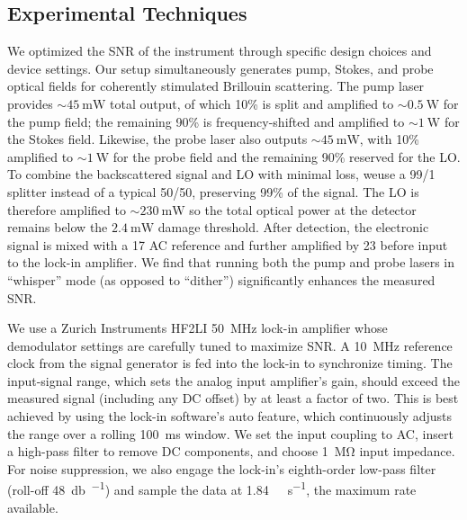 \subsection{Experimental Techniques}
\label{Methods:Experimental Techniques}
We optimized the \ac{SNR} of the instrument through specific design choices and device settings. Our setup simultaneously generates pump, Stokes, and probe optical fields for coherently stimulated Brillouin scattering. The pump laser provides \(\sim\!\SI{45}{\milli\watt}\) total output, of which 10\% is split and amplified to \(\sim\!\SI{0.5}{\watt}\) for the pump field; the remaining 90\% is frequency-shifted and amplified to \(\sim\!\SI{1}{\watt}\) for the Stokes field. Likewise, the probe laser also outputs \(\sim\!\SI{45}{\milli\watt}\), with 10\% amplified to \(\sim\!\SI{1}{\watt}\) for the probe field and the remaining 90\% reserved for the \ac{LO}. To combine the backscattered signal and \ac{LO} with minimal loss, weuse a 99/1 splitter instead of a typical 50/50, preserving 99\% of the signal. The \ac{LO} is therefore amplified to \(\sim\!\SI{230}{\milli\watt}\) so the total optical power at the detector remains below the \(\SI{2.4}{\milli\watt}\) damage threshold. After detection, the electronic signal is mixed with a \SI{17}{\dBm} \ac{AC} reference and further amplified by \SI{23}{\dBm} before input to the lock-in amplifier. We find that running both the pump and probe lasers in “whisper” mode (as opposed to “dither”) significantly enhances the measured SNR.

We use a Zurich Instruments HF2LI \SI{50}{\mega\hertz} lock-in amplifier whose demodulator settings are carefully tuned to maximize \ac{SNR}. A \SI{10}{\mega\hertz} reference clock from the signal generator is fed into the lock-in to synchronize timing. The input-signal range, which sets the analog input amplifier’s gain, should exceed the measured signal (including any \ac{DC} offset) by at least a factor of two. This is best achieved by using the lock-in software’s auto feature, which continuously adjusts the range over a rolling \SI{100}{\milli\second} window. We set the input coupling to \ac{AC}, insert a high-pass filter to remove \ac{DC} components, and choose \SI{1}{\mega\ohm} input impedance. For noise suppression, we also engage the lock-in’s eighth-order low-pass filter (roll-off \SI{48}{\decibel\per\octave}) and sample the data at \SI{1.84}{\mega\sample\per\second}, the maximum rate available.

